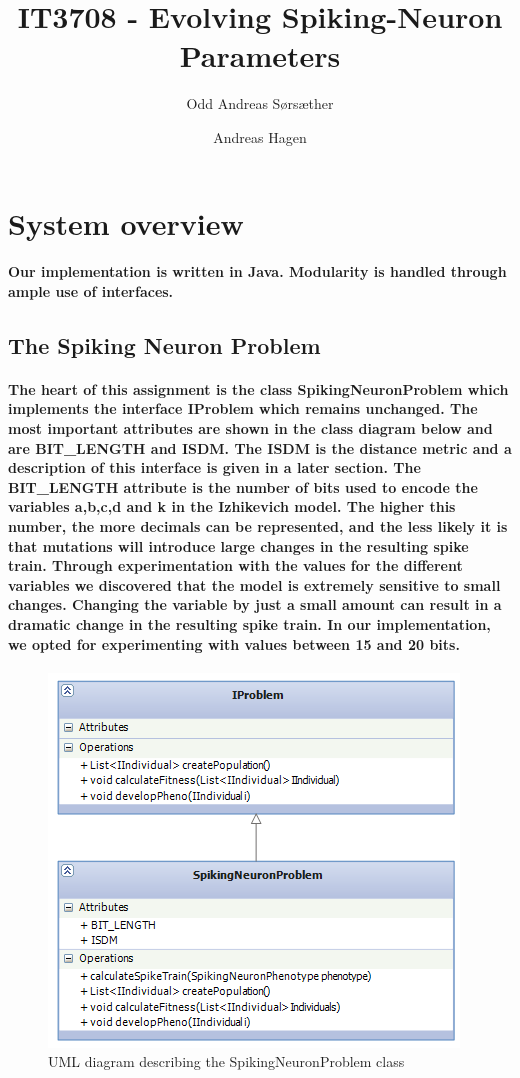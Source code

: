 \documentclass[titlepage,norsk]{article}
\title{IT3708 - Evolving Spiking-Neuron Parameters}
\author{Odd Andreas Sørsæther \and Andreas Hagen}
\begin{document}
\maketitle


\section{System overview}

\paragraph{Our implementation is written in Java. Modularity is handled through ample use of interfaces.}


\subsection{The Spiking Neuron Problem}

\paragraph{
The heart of this assignment is the class SpikingNeuronProblem which implements the interface IProblem which remains unchanged. The most important attributes are shown in the class diagram below and are BIT\_LENGTH and ISDM. The ISDM is the distance metric and a description of this interface is given in a later section. The BIT\_LENGTH attribute is the number of bits used to encode the variables a,b,c,d and k in the Izhikevich model. The higher this number, the more decimals can be represented, and the less likely it is that mutations will introduce large changes in the resulting spike train. Through experimentation with the values for the different variables we discovered that the model is extremely sensitive to small changes. Changing the variable by just a small amount can result in a dramatic change in the resulting spike train. In our implementation, we opted for experimenting with values between 15 and 20 bits.
}

\begin{figure}
\centering
\includegraphics{SpikingNeuronProblem_UML.png}
\caption{UML diagram describing the SpikingNeuronProblem class}
\label{fig:awesome_image}
\end{figure}
\end{document}
